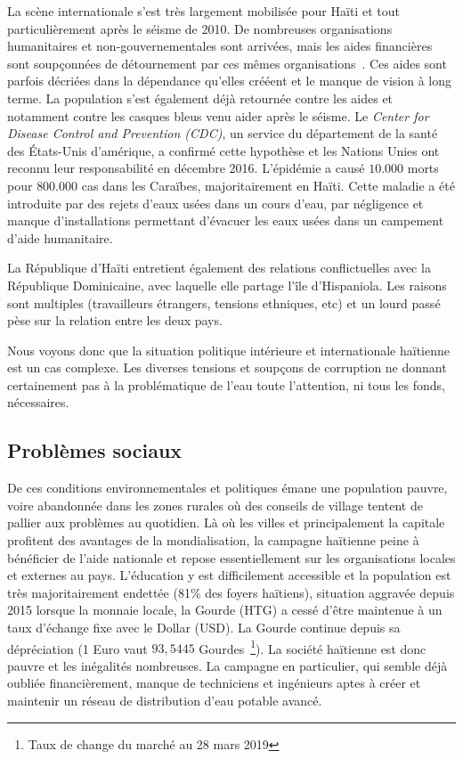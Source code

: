 \documentclass{eplmastersthesis_FR}
\begin{document}
				La scène internationale s'est très largement mobilisée pour Haïti et tout particulièrement après le séisme de 2010. De nombreuses organisations humanitaires et non-gouvernementales sont arrivées, mais les aides financières sont soupçonnées de détournement par ces mêmes organisations~\cite{ref:analyse_contextuelle_commune}. Ces aides sont parfois décriées dans la dépendance qu'elles crééent et le manque de vision à long terme. La population s'est également déjà retournée contre les aides et notamment contre les casques bleus venu aider après le séisme. Le \emph{Center for Disease Control and Prevention (CDC)}, un service du département de la santé des \'Etats-Unis d'amérique, a confirmé cette hypothèse et les Nations Unies ont reconnu leur responsabilité en décembre 2016. L'épidémie a causé $10.000$ morts pour $800.000$ cas dans les Caraïbes, majoritairement en Haïti. Cette maladie a été introduite par des rejets d'eaux usées dans un cours d'eau, par négligence et manque d'installations permettant d'évacuer les eaux usées dans un campement d'aide humanitaire.

				La République d'Haïti entretient également des relations conflictuelles avec la République Dominicaine, avec laquelle elle partage l'île d'Hispaniola. Les raisons sont multiples (travailleurs étrangers, tensions ethniques, etc) et un lourd passé pèse sur la relation entre les deux pays.

				Nous voyons donc que la situation politique intérieure et internationale haïtienne est un cas complexe. Les diverses tensions et soupçons de corruption ne donnant certainement pas à la problématique de l'eau toute l'attention, ni tous les fonds, nécessaires.

			\subsection*{Problèmes sociaux}
				De ces conditions environnementales et politiques émane une population pauvre, voire abandonnée dans les zones rurales où des conseils de village tentent de pallier aux problèmes au quotidien. Là où les villes et principalement la capitale profitent des avantages de la mondialisation, la campagne haïtienne peine à bénéficier de l'aide nationale et repose essentiellement sur les organisations locales et externes au pays. L'éducation y est difficilement accessible et la population est très majoritairement endettée (81\% des foyers haïtiens), situation aggravée depuis 2015 lorsque la monnaie locale, la Gourde (HTG) a cessé d'être maintenue à un taux d'échange fixe avec le Dollar (USD). La Gourde continue depuis sa dépréciation (1 Euro vaut $93,5445$ Gourdes~\footnote{Taux de change du marché au 28 mars 2019}). La société haïtienne est donc pauvre et les inégalités nombreuses. La campagne en particulier, qui semble déjà oubliée financièrement, manque de techniciens et ingénieurs aptes à créer et maintenir un réseau de distribution d'eau potable avancé.
\end{document}
